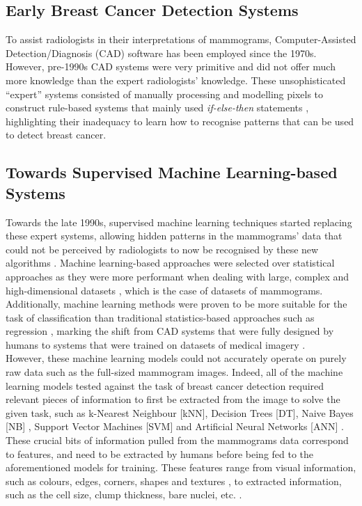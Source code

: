\subsection{Early Breast Cancer Detection Systems}
\label{sec:litreview-bcd-early-cad}

To assist radiologists in their interpretations of mammograms, Computer-Assisted Detection/Diagnosis (CAD) software has been employed since the 1970s. However, pre-1990s CAD systems were very primitive and did not offer much more knowledge than the expert radiologists' knowledge. These unsophisticated ``expert'' systems consisted of manually processing and modelling pixels to construct rule-based systems that mainly used \textit{if-else-then} statements \citep{Litjens2017}, highlighting their inadequacy to learn how to recognise patterns that can be used to detect breast cancer.

\subsection{Towards Supervised Machine Learning-based Systems}

Towards the late 1990s, supervised machine learning techniques started replacing these expert systems, allowing hidden patterns in the mammograms' data that could not be perceived by radiologists to now be recognised by these new algorithms \citep{Litjens2017}. Machine learning-based approaches were selected over statistical approaches as they were more performant when dealing with large, complex and high-dimensional datasets \citep{Yue2018}, which is the case of datasets of mammograms. Additionally, machine learning methods were proven to be more suitable for the task of classification than traditional statistics-based approaches such as regression \citep{Paliwal2009}, marking the shift from CAD systems that were fully designed by humans to systems that were trained on datasets of medical imagery \citep{Litjens2017}.\\

However, these machine learning models could not accurately operate on purely raw data such as the full-sized mammogram images. Indeed, all of the machine learning models tested against the task of breast cancer detection required relevant pieces of information to first be extracted from the image to solve the given task, such as k-Nearest Neighbour [kNN], Decision Trees [DT], Naive Bayes [NB] \citep{Asri2016}, Support Vector Machines [SVM] \citep{Ramos-Pollan2012} and Artificial Neural Networks [ANN] \citep{Yue2018}. These crucial bits of information pulled from the mammograms data correspond to features, and need to be extracted by humans before being fed to the aforementioned models for training. These features range from visual information, such as colours, edges, corners, shapes and textures \citep{Geron2019}, to extracted information, such as the cell size, clump thickness, bare  nuclei, etc. \citep{Yue2018}.\\

